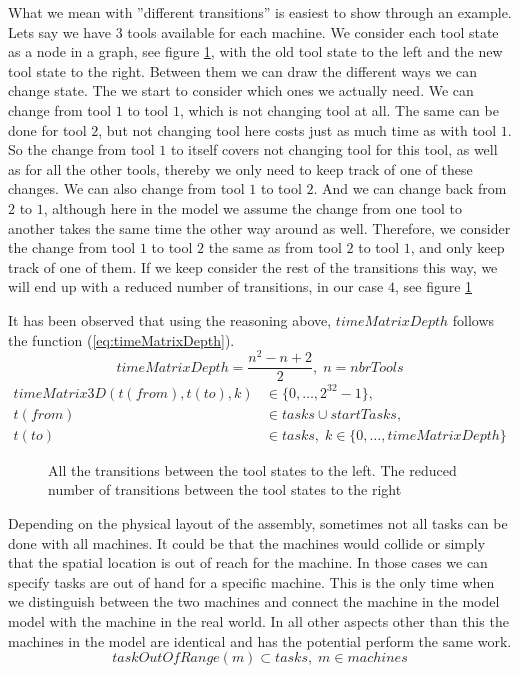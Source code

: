  What we mean with ''different transitions'' is easiest to show through an example. Lets say we have $3$ tools available for each machine. We consider each tool state as a node in a graph, see figure \ref{fig:tools_trans}, with the old tool state to the left and the new tool state to the right. Between them we can draw the different ways we can change state. The we start to consider which ones we actually need. We can change from tool $1$ to tool $1$, which is not changing tool at all. The same can be done for tool $2$, but not changing tool here costs just as much time as with tool $1$. So the change from tool $1$ to itself covers not changing tool for this tool, as well as for all the other tools, thereby we only need to keep track of one of these changes. We can also change from tool $1$ to tool $2$. And we can change back from $2$ to $1$, although here in the model we assume the change from one tool to another takes the same time the other way around as well. Therefore, we consider the change from tool $1$ to tool $2$ the same as from tool $2$ to tool $1$, and only keep track of one of them. If we keep consider the rest of the transitions this way, we will end up with a reduced number of transitions, in our case $4$, see figure \ref{fig:tools_trans}
 
 It has been observed that using the reasoning above, $timeMatrixDepth$ follows the function (\ref{eq:timeMatrixDepth}).
 \begin{equation}\label{eq:timeMatrixDepth}
 timeMatrixDepth = \frac{n^2 - n + 2}{2}, \; n = nbrTools
 \end{equation}
  \begin{equation}
  \begin{aligned}\label{eq:44}
  timeMatrix3D(t(from),t(to),k) &\in \{0 , \ldots , 2^{32}-1\},\\
  t(from) &\in tasks \cup startTasks,  \\ 
  t(to) &\in tasks, \; k \in \{0 , \ldots , timeMatrixDepth\}
  \end{aligned}
  \end{equation}

 
 \begin{figure}
 	\centering
 	
  	
  	\caption{All the transitions between the tool states to the left. The reduced number of transitions between the tool states to the right}
  	\label{fig:tools_trans}
 \end{figure}

\noindent Depending on the physical layout of the assembly, sometimes not all tasks can be done with all machines. It could be that the machines would collide or simply that the spatial location is out of reach for the machine. In those cases we can specify tasks are out of hand for a specific machine. This is the only time when we distinguish between the two machines and connect the machine in the model model with the machine in the real world. In all other aspects other than this the machines in the model are identical and has the potential perform the same work.
 \begin{equation}\label{eq:56}
 taskOutOfRange(m) \subset tasks, \; m \in machines
 \end{equation}
 
